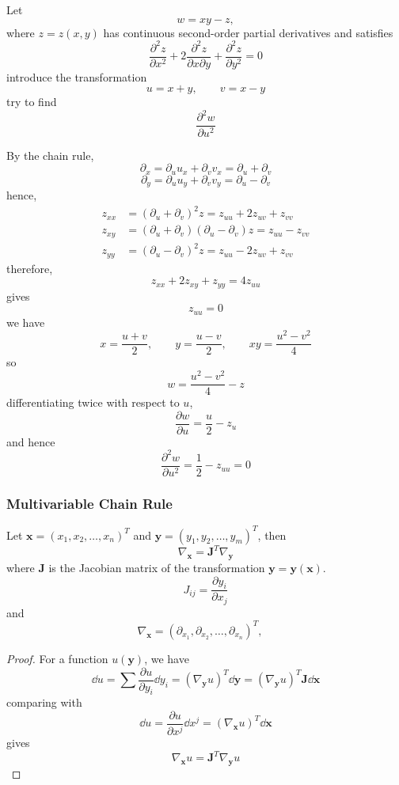 \documentclass[a4]{overview}
\begin{document}
\begin{example}

Let
\[
w=xy-z,
\]
where \(z=z(x,y)\) has continuous second-order partial derivatives and satisfies
\[
\frac{\partial^2 z}{\partial x^2}
+2\frac{\partial^2 z}{\partial x\partial y}
+\frac{\partial^2 z}{\partial y^2}
=0
\]
introduce the transformation
\[
u=x+y,\qquad v=x-y
\]
try to find
\[
\frac{\partial^2 w}{\partial u^2}
\]

\begin{answer}

By the chain rule,
\[
\partial_x = \partial_u u_x + \partial_v v_x
= \partial_u + \partial_v
\]
\[
\partial_y = \partial_u u_y + \partial_v v_y
= \partial_u - \partial_v
\]
hence,
\begin{align*}
z_{xx} &=
\left(\partial_u + \partial_v\right)^2 z
= z_{uu}+2z_{uv}+z_{vv}\\
z_{xy}
&=
\left( \partial_u + \partial_v \right)
\left( \partial_u - \partial_v \right)z
=
z_{uu}-z_{vv}\\
z_{yy}
&= \left( \partial_u - \partial_v \right)^2 z
=
z_{uu}-2z_{uv}+z_{vv}
\end{align*}
therefore,
\[
z_{xx}+2z_{xy}+z_{yy}
=
4z_{uu}
\]
gives
\[
z_{uu}=0
\]
we have
\[
x=\frac{u+v}{2},\qquad y=\frac{u-v}{2} ,\qquad xy = \frac{u^2-v^2}{4}
\]
so
\[
w
=
\frac{u^2-v^2}{4}-z
\]
differentiating twice with respect to \(u\),
\[
\frac{\partial w}{\partial u}
=
\frac{u}{2}-z_u
\]
and hence
\[
\frac{\partial^2 w}{\partial u^2}
= \frac12-z_{uu} = 0
\]
	
\end{answer}
\end{example}

\subsubsection{Multivariable Chain Rule}

\begin{theorem}
	\label{thm:multivariable_chain_rule}
	Let $\boldsymbol{x}=(x_1, x_2, \ldots, x_n)^T$ and $\boldsymbol{y}=(y_1, y_2, \ldots, y_m)^T$, then
	\[
		\nabla_{\boldsymbol{x}} = \boldsymbol{J}^T \nabla_{\boldsymbol{y}}
	\] 
	where $\boldsymbol{J}$ is the Jacobian matrix of the transformation $\boldsymbol{y} = \boldsymbol{y}(\boldsymbol{x})$.
	\[
		J_{ij} = \frac{\partial y_i}{\partial x_j}
	\] 
	and
	\[
		\nabla_{\boldsymbol{x}} = \left(\partial_{x_1}, \partial_{x_2}, \ldots, \partial_{x_n}\right)^T,\quad
	\] 
\end{theorem}
\begin{proof}
	For a function $u(\boldsymbol{y})$, we have
	\[
		\dd u = \sum\frac{\partial u}{\partial y_i} \dd y_i = (\nabla_{\boldsymbol{y}}u)^T \dd \boldsymbol{y}
		= (\nabla_{\boldsymbol{y}}u)^T \boldsymbol{J} \dd \boldsymbol{x}
	\] 
	comparing with
	\[
		\dd u = \frac{\partial u}{\partial x^j} \dd x^j = (\nabla_{\boldsymbol{x}}u)^T \dd \boldsymbol{x}
	\] 
	gives
	\[
		\nabla_{\boldsymbol{x}}u = \boldsymbol{J}^T \nabla_{\boldsymbol{y}}u
	\]
\end{proof}
\end{document}
